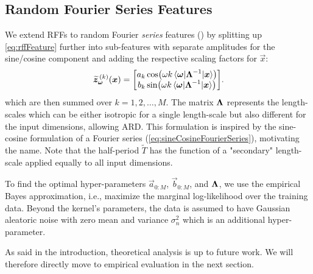 \subsection{Random Fourier Series Features}
	We extend \acp{RFF} to random Fourier \emph{series} features () by splitting up \cref{eq:rffFeature} further into sub-features with separate amplitudes for the sine/cosine component and adding the respective scaling factors for $\vec{x}$:
	\begin{equation}
		\widetilde{\bm{z}}_{\bm{\omega}}^{\,(k)}(\bm{x}) =
			\begin{bmatrix}
				a_k \cos(\omega k \mel{\bm{\omega}}{\bm{\mathrm{\Lambda}}^{-1}}{\bm{x}}) \\
				b_k \sin(\omega k \mel{\bm{\omega}}{\bm{\mathrm{\Lambda}}^{-1}}{\bm{x}})
			\end{bmatrix}\!.
		\label{eq:rfsf}
	\end{equation}
	which are then summed over $k = 1, 2, \dots, M$.
	The matrix $\bm{\mathrm{\Lambda}}$ represents the length-scales which can be either isotropic for a single length-scale but also different for the input dimensions, allowing \ac{ARD}.
	This formulation is inspired by the sine-cosine formulation of a Fourier series (\cref{eq:sineCosineFourierSeries}), motivating the name.
	Note that the half-period $\tilde{T}$ has the function of a "secondary" length-scale applied equally to all input dimensions.

	To find the optimal hyper-parameters $\vec{a}_{0:M}$, $\vec{b}_{0:M}$, and $\bm{\mathrm{\Lambda}}$, we use the empirical Bayes approximation\cite[p.\,165]{bishopPatternRecognitionMachine2006}, i.e., maximize the marginal log-likelihood over the training data.
	Beyond the kernel's parameters, the data is assumed to have Gaussian aleatoric noise with zero mean and variance $\sigma_n^2$ which is an additional hyper-parameter.

	As said in the introduction, theoretical analysis is up to future work.
	We will therefore directly move to empirical evaluation in the next section.


